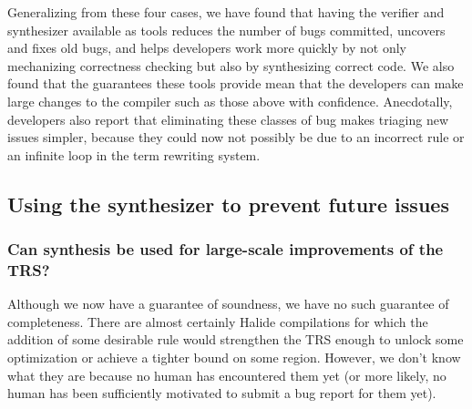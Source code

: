 \documentclass[acmsmall,review,anonymous]{acmart}\settopmatter{printfolios=true,printccs=false,printacmref=false}
\begin{document}
Generalizing from these four cases, we have found that having the verifier and synthesizer available as tools reduces the number of bugs committed, uncovers and fixes old bugs, and helps developers work more quickly by not only mechanizing correctness checking but also by synthesizing correct code. We also found that the guarantees these tools provide mean that the developers can make large changes to the compiler such as those above with confidence. Anecdotally, developers also report that eliminating these classes of bug makes triaging new issues simpler, because they could now not possibly be due to an incorrect rule or an infinite loop in the term rewriting system.

\subsection{Using the synthesizer to prevent future issues}
\label{ssec:compilationspeed}

\subsubsection{Can synthesis be used for large-scale improvements of the TRS?}



Although we now have a guarantee of soundness, we have no such guarantee of completeness. There are almost certainly Halide compilations for which the addition of some desirable rule would strengthen the TRS enough to unlock some optimization or achieve a tighter bound on some region. However, we don’t know what they are because no human has encountered them yet (or more likely, no human has been sufficiently motivated to submit a bug report for them yet). 
\end{document}
